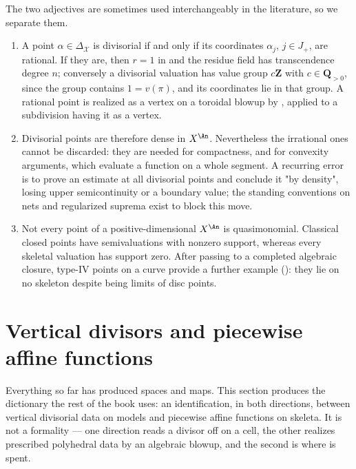 The two adjectives are sometimes used interchangeably in the literature, so
we separate them.

\begin{remark}
\label{rem:quasimonomial-vs-divisorial}
\begin{enumerate}
\item A point $\alpha\in\Delta_{\mathcal X}$ is divisorial if and only if
  its coordinates $\alpha_j$, $j\in J_+$, are rational. If they are, then
  $r=1$ in  and the residue field
  has transcendence degree $n$; conversely a divisorial valuation has
  value group $c\mathbf Z$ with $c\in\mathbf Q_{>0}$, since the group
  contains $1=v(\pi)$, and its coordinates lie in that group. A rational
  point is realized as a vertex on a toroidal blowup by
  , applied to a subdivision having it as a
  vertex.
\item Divisorial points are therefore dense in $X^{\An}$. Nevertheless the
  irrational ones cannot be discarded: they are needed for compactness, and
  for convexity arguments, which evaluate a function on a whole segment. A
  recurring error is to prove an estimate at all divisorial points and
  conclude it "by density", losing upper semicontinuity or a boundary value;
  the standing conventions on nets and regularized suprema exist to block
  this move.
\item Not every point of a positive-dimensional $X^{\An}$ is
  quasimonomial. Classical closed points have semivaluations with nonzero
  support, whereas every skeletal
  valuation has support zero. After passing to a completed algebraic
  closure, type-IV points on a curve provide a further example
  (): they lie on no skeleton despite
  being limits of disc points.
\end{enumerate}
\end{remark}

\section{Vertical divisors and piecewise affine functions}
\label{sec:skeleton-model-functions}

Everything so far has produced spaces and maps. This section produces the
dictionary the rest of the book uses: an identification, in both directions,
between vertical divisorial data on models and piecewise affine functions on
skeleta. It is not a formality --- one direction reads a divisor off on a
cell, the other realizes prescribed polyhedral data by an algebraic blowup,
and the second is where  is spent.

